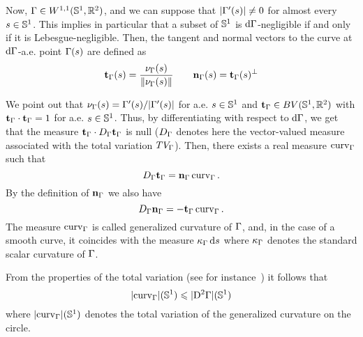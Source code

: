 \begin{defn}
Now, $\Gamma\in W^{1,1}(\mathbb{S}^1, \mathbb{R}^2)$, and we can suppose  that $|\Gamma'(s)|\neq 0$ for almost every $s\in \mathbb{S}^1$. This implies in particular that a subset of $\mathbb{S}^1$ is $\mathrm{d}\Gamma$-negligible if and only if it is Lebesgue-negligible.  Then,  the tangent and normal vectors to the curve at $\mathrm{d}\Gamma$-a.e. point $\Gamma(s)$ are defined as 
\begin{equation}\label{def-tangente}
	\mathbf{t}_\Gamma(s) = \frac{\nu_\Gamma(s)}{\|\nu_\Gamma(s)\|}\quad \quad \mathbf{n}_\Gamma(s)= \mathbf{t}_\Gamma(s)^\bot
\end{equation}
\par  We point out that $\nu_\Gamma(s) = \Gamma'(s)/|\Gamma'(s)|$ for a.e. $s\in \mathbb{S}^1$ and  $\mathbf{t}_\Gamma\in BV(\mathbb{S}^1,\mathbb{R}^2)$ with   $\mathbf{t}_\Gamma\cdot\mathbf{t}_\Gamma=1$ for a.e. $s\in \mathbb{S}^1$. Thus, by differentiating with respect to $\mathrm{d} \Gamma$, we get that the measure  $\mathbf{t}_\Gamma\cdot D_\Gamma\mathbf{t}_\Gamma $ is null ($D_\Gamma$ denotes here the vector-valued measure associated with the total variation $TV_\Gamma$).
Then, there exists a real measure $\rm{curv}_\Gamma$ such that
\begin{equation}\label{deriv-tang}
D_\Gamma\mathbf{t}_\Gamma = \mathbf{n}_\Gamma \,\rm{curv}_\Gamma\,.
\end{equation}
By the definition of $\mathbf{n}_\Gamma$ we also have
\begin{equation}\label{deriv-norm}
	D_\Gamma\mathbf{n}_\Gamma = -\mathbf{t}_\Gamma \,\rm{curv}_\Gamma\,.
\end{equation}
The measure $\rm{curv}_\Gamma$ is  called generalized curvature of $\Gamma$, and, in the case of a smooth curve,  it  coincides with the measure $\kappa_\Gamma \,\mathrm{d} s$ where $\kappa_\Gamma$ denotes the standard scalar curvature of $\Gamma$. 
\par From the properties of the total variation  (see for instance~\cite{AFP}) it follows that 
\begin{equation}\label{curvature}
	|\rm{curv}_\Gamma|(\mathbb{S}^1)\leqslant |D^2\Gamma|(\mathbb{S}^1)
\end{equation}
where $|\rm{curv}_\Gamma|(\mathbb{S}^1)$ denotes the total variation of the generalized curvature on the circle. 
\end{defn}

